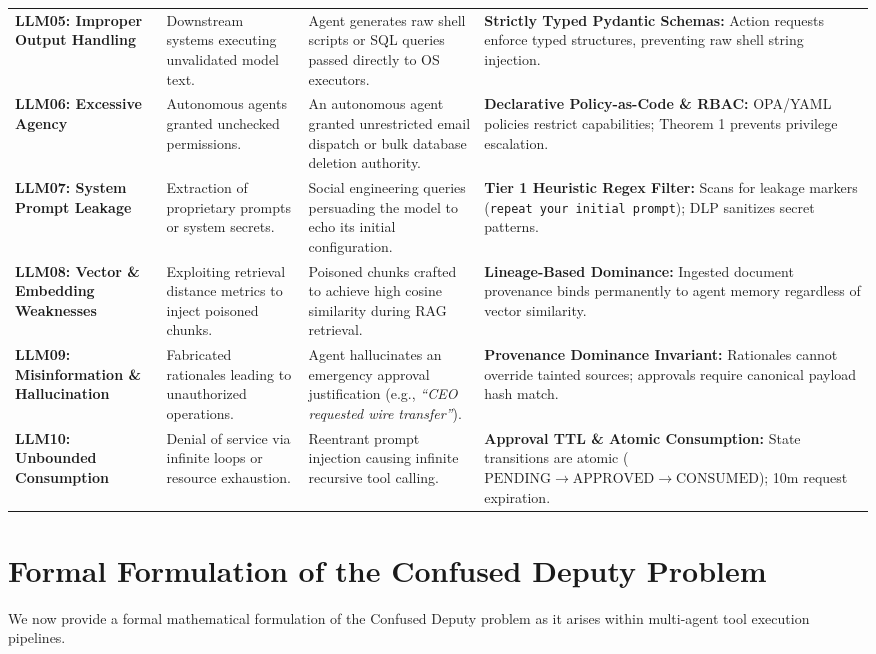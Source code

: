 \begin{table}[htbp]
\begin{tabularx}{\textwidth}{p{2.2cm}p{3.0cm}p{4.2cm}X}
\addlinespace
\textbf{LLM05: Improper Output Handling} & Downstream systems executing unvalidated model text. & Agent generates raw shell scripts or SQL queries passed directly to OS executors. & \textbf{Strictly Typed Pydantic Schemas:} Action requests enforce typed structures, preventing raw shell string injection. \\
\addlinespace
\textbf{LLM06: Excessive Agency} & Autonomous agents granted unchecked permissions. & An autonomous agent granted unrestricted email dispatch or bulk database deletion authority. & \textbf{Declarative Policy-as-Code \& RBAC:} OPA/YAML policies restrict capabilities; Theorem 1 prevents privilege escalation. \\
\addlinespace
\textbf{LLM07: System Prompt Leakage} & Extraction of proprietary prompts or system secrets. & Social engineering queries persuading the model to echo its initial configuration. & \textbf{Tier 1 Heuristic Regex Filter:} Scans for leakage markers (\texttt{repeat your initial prompt}); DLP sanitizes secret patterns. \\
\addlinespace
\textbf{LLM08: Vector \& Embedding Weaknesses} & Exploiting retrieval distance metrics to inject poisoned chunks. & Poisoned chunks crafted to achieve high cosine similarity during RAG retrieval. & \textbf{Lineage-Based Dominance:} Ingested document provenance binds permanently to agent memory regardless of vector similarity. \\
\addlinespace
\textbf{LLM09: Misinformation \& Hallucination} & Fabricated rationales leading to unauthorized operations. & Agent hallucinates an emergency approval justification (e.g., \textit{``CEO requested wire transfer''}). & \textbf{Provenance Dominance Invariant:} Rationales cannot override tainted sources; approvals require canonical payload hash match. \\
\addlinespace
\textbf{LLM10: Unbounded Consumption} & Denial of service via infinite loops or resource exhaustion. & Reentrant prompt injection causing infinite recursive tool calling. & \textbf{Approval TTL \& Atomic Consumption:} State transitions are atomic ($\text{PENDING} \to \text{APPROVED} \to \text{CONSUMED}$); 10m request expiration. \\
\bottomrule
\end{tabularx}
\end{table}

\section{Formal Formulation of the Confused Deputy Problem}
We now provide a formal mathematical formulation of the Confused Deputy problem as it arises within multi-agent tool execution pipelines.

